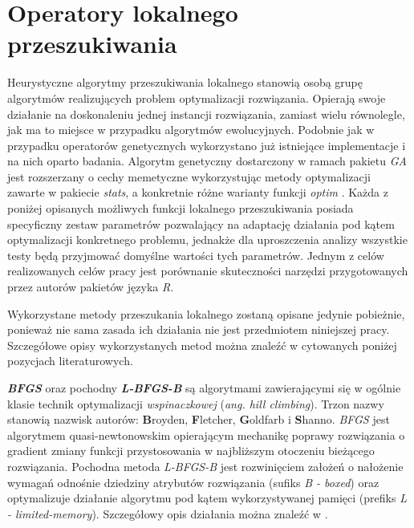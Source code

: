 \section{Operatory lokalnego przeszukiwania}
\label{sec:operatory_lokalnego_przeszukiwania}
\par
Heurystyczne algorytmy przeszukiwania lokalnego stanowią osobą grupę algorytmów realizujących problem optymalizacji rozwiązania. Opierają swoje działanie na doskonaleniu jednej instancji rozwiązania, zamiast wielu równolegle, jak ma to miejsce w przypadku algorytmów ewolucyjnych. Podobnie jak w przypadku operatorów genetycznych wykorzystano już istniejące implementacje i na nich oparto badania. Algorytm genetyczny dostarczony w ramach pakietu \emph{GA} \cite{gaPackage} jest rozszerzany o cechy memetyczne wykorzystując metody optymalizacji zawarte w pakiecie \emph{stats}, a konkretnie różne warianty funkcji \emph{optim} \cite{statsPackage}. Każda z poniżej opisanych możliwych funkcji lokalnego przeszukiwania posiada specyficzny zestaw parametrów pozwalający na adaptację działania pod kątem optymalizacji konkretnego problemu, jednakże dla uproszczenia analizy wszystkie testy będą przyjmować domyślne wartości tych parametrów. Jednym z celów realizowanych celów pracy jest porównanie skuteczności narzędzi przygotowanych przez autorów pakietów języka \emph{R}.
\par
Wykorzystane metody przeszukania lokalnego zostaną opisane jedynie pobieżnie, ponieważ nie sama zasada ich działania nie jest przedmiotem niniejszej pracy. Szczegółowe opisy wykorzystanych metod można znaleźć w cytowanych poniżej pozycjach literaturowych.
\par
\textbf{\emph{BFGS}} oraz pochodny \textbf{\emph{L-BFGS-B}} są algorytmami zawierającymi się w ogólnie klasie technik optymalizacji \emph{wspinaczkowej} (\emph{ang. hill climbing}). Trzon nazwy stanowią nazwisk autorów:  \textbf{B}royden, \textbf{F}letcher, \textbf{G}oldfarb i \textbf{S}hanno. \emph{BFGS} jest algorytmem quasi-newtonowskim opierającym mechanikę poprawy rozwiązania o gradient zmiany funkcji przystosowania w najbliższym otoczeniu bieżącego rozwiązania. Pochodna metoda \emph{L-BFGS-B} jest rozwinięciem założeń o nałożenie wymagań odnośnie dziedziny atrybutów rozwiązania (sufiks \emph{B - boxed}) oraz optymalizuje działanie algorytmu pod kątem wykorzystywanej pamięci (prefiks \emph{L - limited-memory}). Szczegółowy opis działania można znaleźć w \cite{nocedal2006numerical}. 
